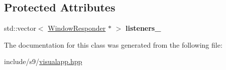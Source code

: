 \subsection*{\-Protected \-Attributes}
\begin{DoxyCompactItemize}
\item 
\hypertarget{classs9_1_1WindowApp_a33dc22fb9cd14198de0fcc8d3a93ed16}{std\-::vector$<$ \hyperlink{classs9_1_1WindowResponder}{\-Window\-Responder} $\ast$ $>$ {\bfseries listeners\-\_\-}}\label{classs9_1_1WindowApp_a33dc22fb9cd14198de0fcc8d3a93ed16}

\end{DoxyCompactItemize}


\-The documentation for this class was generated from the following file\-:\begin{DoxyCompactItemize}
\item 
include/s9/\hyperlink{visualapp_8hpp}{visualapp.\-hpp}\end{DoxyCompactItemize}

